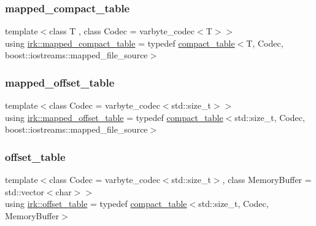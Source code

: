 \subsubsection{\texorpdfstring{mapped\+\_\+compact\+\_\+table}{mapped\_compact\_table}}
{\footnotesize\ttfamily template$<$class T , class Codec  = varbyte\+\_\+codec$<$\+T$>$$>$ \\
using \mbox{\hyperlink{namespaceirk_a355b82a658f8685da29eca82444fed3c}{irk\+::mapped\+\_\+compact\+\_\+table}} = typedef \mbox{\hyperlink{classirk_1_1compact__table}{compact\+\_\+table}}$<$T, Codec, boost\+::iostreams\+::mapped\+\_\+file\+\_\+source$>$}

\mbox{\label{namespaceirk_ab3084e78181e92fe4bea7332e0a77e98}} 
\subsubsection{\texorpdfstring{mapped\+\_\+offset\+\_\+table}{mapped\_offset\_table}}
{\footnotesize\ttfamily template$<$class Codec  = varbyte\+\_\+codec$<$std\+::size\+\_\+t$>$$>$ \\
using \mbox{\hyperlink{namespaceirk_ab3084e78181e92fe4bea7332e0a77e98}{irk\+::mapped\+\_\+offset\+\_\+table}} = typedef \mbox{\hyperlink{classirk_1_1compact__table}{compact\+\_\+table}}$<$std\+::size\+\_\+t, Codec, boost\+::iostreams\+::mapped\+\_\+file\+\_\+source$>$}

\mbox{\label{namespaceirk_a3d7b00f359d122e0bf0f709d21f00098}} 
\subsubsection{\texorpdfstring{offset\+\_\+table}{offset\_table}}
{\footnotesize\ttfamily template$<$class Codec  = varbyte\+\_\+codec$<$std\+::size\+\_\+t$>$, class Memory\+Buffer  = std\+::vector$<$char$>$$>$ \\
using \mbox{\hyperlink{namespaceirk_a3d7b00f359d122e0bf0f709d21f00098}{irk\+::offset\+\_\+table}} = typedef \mbox{\hyperlink{classirk_1_1compact__table}{compact\+\_\+table}}$<$std\+::size\+\_\+t, Codec, Memory\+Buffer$>$}

\mbox{\label{namespaceirk_a1e48b43a3f40d553264380da5e7263c1}} 

